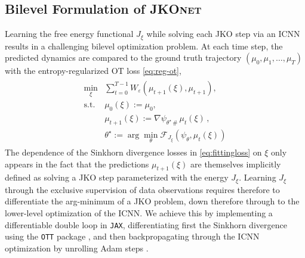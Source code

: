 \subsection{Bilevel Formulation of \textsc{JKOnet}}
Learning the free energy functional $J_\xi$ while solving each \acrshort{JKO} step via an ICNN results in a challenging bilevel optimization problem.
At each time step, the predicted dynamics are compared to the ground truth trajectory $(\mu_0, \mu_1, \dots, \mu_T)$ with the entropy-regularized OT loss \eqref{eq:reg-ot},
\begin{align} \label{eq:fittingloss}
\begin{split}
    \min_\xi & \sum_{t=0}^{T-1} W_\varepsilon(\mu_{t+1}(\xi), \mu_{t+1}), \\
    \text{s.t. } & \mu_{0}(\xi) := \mu_0, \\
      & \mu_{t+1}(\xi) := \nabla \psi_{\theta^\star\, \#}\, \mu_{t}(\xi)\,, \\
      & \theta^\star:=\arg \min_{\theta} \mathcal{F}_{J_{\xi}}(\psi_{\theta},\mu_t(\xi))
\end{split}
\end{align}
The dependence of the Sinkhorn divergence losses in \eqref{eq:fittingloss} on $\xi$ only appears in the fact that the predictions $\mu_{t+1}(\xi)$ are themselves implicitly defined as solving a \acrshort{JKO} step parameterized with the energy $J_\xi$. 
Learning  $J_\xi$ through the exclusive supervision of data observations requires therefore to differentiate the arg-minimum of a \acrshort{JKO} problem, down therefore through to the lower-level optimization of the ICNN. We achieve this by implementing a differentiable double loop in \texttt{JAX}, differentiating first the Sinkhorn divergence using the \texttt{OTT} package \citep{cuturi2022optimal}, and then backpropagating through the ICNN optimization by unrolling Adam steps \citep{kingma2014adam, metz2016unrolled, lorraine2020optimizing}.


